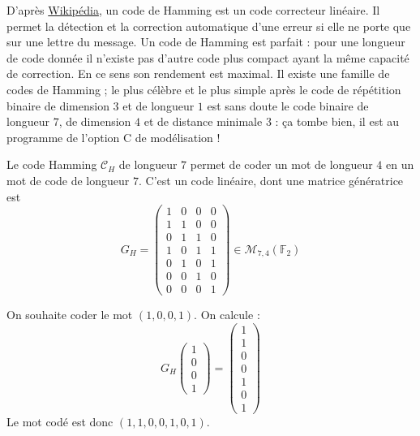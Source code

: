   D'après \href{https://fr.wikipedia.org/wiki/Code_de_Hamming}{Wikipédia}, un code de Hamming est un code correcteur linéaire. Il permet la détection et la correction automatique d'une erreur si elle ne porte que sur une lettre du message. Un code de Hamming est parfait : pour une longueur de code donnée il n'existe pas d'autre code plus compact ayant la même capacité de correction. En ce sens son rendement est maximal. Il existe une famille de codes de Hamming ; le plus célèbre et le plus simple après le code de répétition binaire de dimension $3$ et de longueur $1$ est sans doute le code binaire de longueur $7$, de dimension $4$ et de distance minimale $3$ : ça tombe bien, il est au programme de l'option C de modélisation !

  \begin{definition}
    Le code Hamming $\mathcal{C}_H$ de longueur $7$ permet de coder un mot de longueur $4$ en un mot de code de longueur $7$. C'est un code linéaire, dont une matrice génératrice est
    \[ G_H = \begin{pmatrix}
      1 & 0 & 0 & 0 \\
      1 & 1 & 0 & 0 \\
      0 & 1 & 1 & 0 \\
      1 & 0 & 1 & 1 \\
      0 & 1 & 0 & 1 \\
      0 & 0 & 1 & 0 \\
      0 & 0 & 0 & 1
    \end{pmatrix} \in \mathcal{M}_{7,4}(\mathbb{F}_2) \]
  \end{definition}

  \begin{example}
    On souhaite coder le mot $(1,0,0,1)$. On calcule :
    \[ G_H \begin{pmatrix} 1 \\ 0 \\ 0 \\ 1 \end{pmatrix}  = \begin{pmatrix} 1 \\ 1 \\ 0 \\ 0 \\ 1 \\ 0 \\ 1 \end{pmatrix} \]
    Le mot codé est donc $(1,1,0,0,1,0,1)$.
  \end{example}

